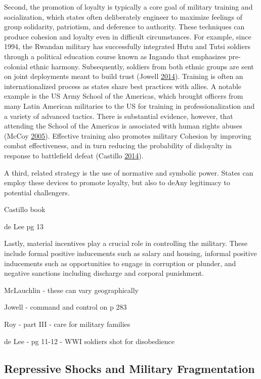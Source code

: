 \documentclass[
  12pt,
]{article}
\begin{document}
Second, the promotion of loyalty is typically a core goal of military training and socialization, which states often deliberately engineer to maximize feelings of group solidarity, patriotism, and deference to authority. These techniques can produce cohesion and loyalty even in difficult circumstances. For example, since 1994, the Rwandan military has successfully integrated Hutu and Tutsi soldiers through a political education course known as Ingando that emphasizes pre-colonial ethnic harmony. Subsequently, soldiers from both ethnic groups are sent on joint deployments meant to build trust (Jowell \protect\hyperlink{ref-Jowell2014}{2014}). Training is often an internationalized process as states share best practices with allies. A notable example is the US Army School of the Americas, which brought officers from many Latin American militaries to the US for training in professionalization and a variety of advanced tactics. There is substantial evidence, however, that attending the School of the Americas is associated with human rights abuses (McCoy \protect\hyperlink{ref-McCoy2005a}{2005}). Effective training also promotes military Cohesion by improving combat effectiveness, and in turn reducing the probability of disloyalty in response to battlefield defeat (Castillo \protect\hyperlink{ref-Castillo2014}{2014}).

A third, related strategy is the use of normative and symbolic power. States can employ these devices to promote loyalty, but also to deAny legitimacy to potential challengers.

Castillo book

de Lee pg 13

Lastly, material incentives play a crucial role in controlling the military. These include formal positive inducements such as salary and housing, informal positive inducements such as opportunities to engage in corruption or plunder, and negative sanctions including discharge and corporal punishment.

McLauchlin - these can vary geographically

Jowell - command and control on p 283

Roy - part III - care for military families

de Lee - pg 11-12 - WWI soldiers shot for disobedience

\hypertarget{repressive-shocks-and-military-fragmentation}{%
\subsection{Repressive Shocks and Military Fragmentation}\label{repressive-shocks-and-military-fragmentation}}
\end{document}
